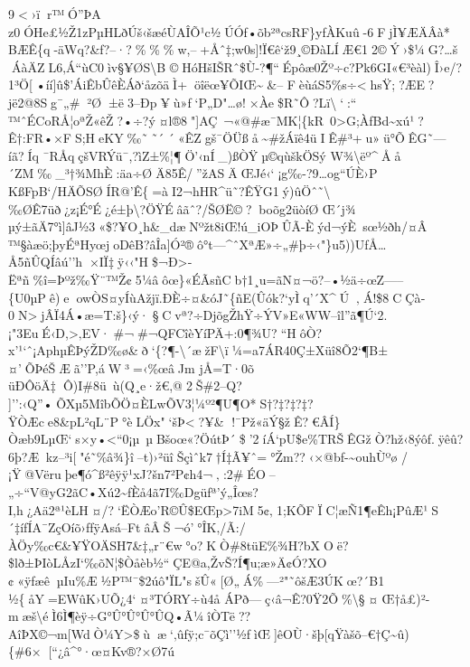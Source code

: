 9\textless›ïr™Ó''ÞA
z0ÓHe£½Ž1zPµHLðÚš‹šæéÙAÎÕ¹c½ÚÓƒ•õb²ªcsRF\}yfÀKuû-6FjÌ¥ÆÄÂà*
BÆ\textbar Ê\{q\textquotesingle-äWq?\&ƒ?--·?\%\%\%w,--+Åˆ‡;w0s{]}!Ï€ê`ž9¸©ÐàLÍÆ€12©Ý›\$¼G?\ldots š
ÁàÄZL6‚Á``ùC0ìv§¥ØS\textbackslash B
©HóHšIŠRˆ\$Ù-?¶``Épôæ0Žº÷c?Pk6GI«\textbar€³èàl)Î›e/?1³Ö{[}•íí{]}û\$'ÁiÊbÛêÈÁð`åzõäÌ+öîëœ¥ÕIŒ\textasciitilde\&--
FèùáS5\%s÷\textlesshsŸ;?ÆE?jë2@8Sg¯„\#²Ø±ë3--Ðp¥ù»f`P„D"\ldots ø!­×Àe\$R˜Ô?Lï\textbackslash`:``
™ˆÉCoRÅ¦oªŽ«êŽ?•÷?ý¤l®8"{]}AÇ~¬«@\#æ¯MK¦\{kR~0\textgreater G;ÀfBd\textasciitilde xú¹?Ê†:FR•×FS;HeKY‰˜˜´
´«ÊZgš¯ÖÜßå\textasciitilde\#žÁïê4ü\textquotesingleIÊ\#³+u»ü°ÕÊG˜---
 íã ?Íq ¯RÅqçš­VRÝü¯,?ìZ±\%¦¶Ö'‹nÍ\_)ßÒŸµ©q­ùškÖSý
W¾\textbackslash ëº\^{}Åå´ZM‰\_³†¾MhÈ:äa÷ØÄ85Ê/''žASÄŒJé‹ `¡g‰-?9\ldots og``ÚÈ›P
KßFpB`/HÄÕSØÍR@'Ê\{=àI2¬hHR\^{}ü˜?ÊŸG1ý)ûÖˆ˜\textbackslash‰ØÊ7üð¿z¡É°É¿é±þ\textbackslash?ÖŸÉâãˆ?/ŠØË©?boõg2üòíØ Œ´j¾
µý±ãÄ7°ì{]}âJ½3«\$?¥O¸h\&\_\textbar dæNºžt8iŒ!ú\_iOÞÛÃ-Èýd¬ýÈ~sœ½ðh\textbar/¤Â
™§àæö;þyÉªHyœjoDêB?â\textquotesingle Îa{]}Ó²®ô°t---\^{}ˆXªÆ»÷„\#þ÷‹"\}u5))UƒÅ\ldots Å5ñÛQÍâú''h×IÏ‡ÿ‹‹"H\$¬Ð\textgreater­Ëªñ\%î=Þºž‰Ÿ¨™Ž¢5¼âôœ\}«ÉÃsñCb†1¸u=ãN¤¬ö?--•½ä÷œZ-----\{U0µPê)\textquotesingle eowÒS¤yÍùAžjï.ÐÈ÷¤\&óJ˜\{ñE(Ûók?{}`yÌq'´X\^{}Ú‚Á!\$8CÇà­0N\textgreaterjÂÏ\textquotesingle4Á•æ=T:š\}‹ý·§Cvª?÷DjõgŽhŸ÷ÝV»E«WW--îl''ã¶Ú`2.¡"3EuÉ‹D,\textgreater‚EV·\#¬\#¬\textbar QFCîèYíPÄ+:0¶¾U?``HôÒ?x\textquotesingle'¹`ˆ¡AphµÊÞýŽD‰ø\&ð`\{?­¶-\textbackslash´­æžF\textbackslash ï¼=a7ÁR40Ç±Xüî\textless@8Õ2`¶B±¤'ÕÞéŠÆã''P,áW ³=‹\%œâJm
\textquotesingle jÅ=T\textbar·0õ üÐÔöÄ‡Ô)I\#8ü~ ù(Q¸e·ž€,@2Š\#2--Q?
{]}'':‹Q''•ÕXµ5MîbÕÖ¤ÈLwÕV3¦¼º²¶U¶O*S†?‡?‡?‡?ŸÒÆce8\&pL²qL¨P°èLÖx"`šÞ\textless*?¥\&
!¯Pž«äÝ§žÊ?€ÂÍ\}Òæb9LµŒ`s×y•\textless``0¡µ~µBšoœ«?ÖútÞ´\$'2íÁ`pU\$e\%TRŠÊGžÒ?hž‹8ýôf.ÿêû?6þ?Æk\textbar z--³i{[}"é˜\%â¾\}î--t)›²ü\textquotesingle îŠçìˆk7†Í‡Ã¥ˆ=°Žm??‹×@bf-\textasciitilde ouhÙºø
/¡Ÿ@Vëruþe¶ó\^{}ß²êÿÿ¹xJ?šn7²P¢h4¬‚:2\#ÉO--
„÷``V@yG2ãC•Xú2\textasciitilde ƒÈå4ã7I‰Dgüfª'ý„Îœs?I,h¿Aä2ª¹èLH¤/?`ËÒÆo'R©Û\$EŒp\textgreater7iM5¢‚1;KÕFÏC¦æÑ1¶eÊh¡PûÆ\textquotesingle¹S´‡íƒÍA¯ZçOíõ›ƒfÿAsá--Ft\textquotesingle âÂŠ¬ó' °ÎK‚/Ã:/À Öy‰c€\&¥ŸOÄSH7\&‡„r¨€w°o?KÒ\#8tüE\%¾H?bXOë?\$lð±ÞIòLÅz\textquotesingle I`‰õN¦\$Òåèb½``ÇE@a,ŽvŠ?Í¶u;æ»Ä¢Ó?XO
¢«ÿƒæêµIu\%Æ½P™¯\$2úô"ÏL"sšÛ«{[}Ø„Á\%---²"˜ôšÆ3ÚKœ?´B1
½\{åY=EWûK›UÕ¿4`¤³TÓRY÷ù4å
ÁPð---ç‹â¬Ê?0Ÿ2Õ\%\textbackslash§¤Œ†å£)²-mæš\textbackslash éÌ6Ì¶èÿ÷G°Û°Û°Û°ÛQ•Ã¼îÒTë??AîÞX©¬m{[}WdÒ¼Y\textgreater\$ùæ`‚ûƒÿ\textquotesingle;c¯õÇì''½fìŒ{]}êOÙ·šþ{[}qŸàšõ--€†Ç\textasciitilde û)\{\#6\textquotesingle×{[}``¿â\textquotesingle\^{}°·œ¤Kv®?×Ø7ú

